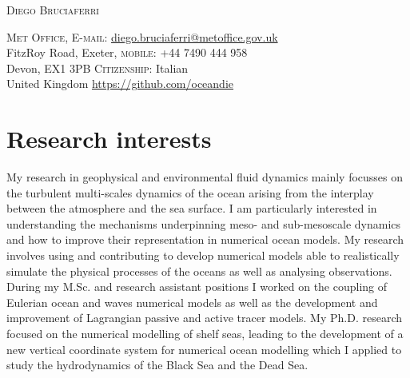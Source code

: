 \documentclass[a4paper, oneside, final]{scrartcl}
\newcommand\YUGE{\fontsize{30}{60}\selectfont}
\begin{document}

\begin{center}
\YUGE \textsc{Diego Bruciaferri}\\
\end{center}
\bigskip%
\textsc{Met Office}, \hspace{6.2cm} \textsc{E-mail}: \href{mailto:diego.bruciaferri@metoffice.gov.uk}{diego.bruciaferri@metoffice.gov.uk}\\
FitzRoy Road, Exeter, \hspace{7.5cm} \textsc{mobile}: +44 7490 444 958\\
Devon, EX1 3PB \hspace{9.4cm} \textsc{Citizenship}: Italian\\
United Kingdom \hspace{7.6cm} \url{https://github.com/oceandie}\\

\section{Research interests}
\normalsize
\noindent
My research in geophysical and environmental fluid dynamics mainly focusses on the turbulent multi-scales dynamics of the ocean arising from the interplay between the atmosphere and the sea surface. I am particularly interested in understanding the mechanisms underpinning meso- and sub-mesoscale dynamics %
and how to improve their representation in numerical ocean models. My research involves using and contributing to develop numerical models able to realistically simulate the physical processes of the oceans as well as analysing observations. During my M.Sc. and research assistant positions I worked on the coupling of Eulerian ocean and waves numerical models as well as the development and improvement of Lagrangian passive and active tracer models. My Ph.D. research focused on the numerical modelling of shelf seas, leading to the development of a new vertical coordinate system for numerical ocean modelling which I applied to study the hydrodynamics of the Black Sea and the Dead Sea. %
\end{document}
